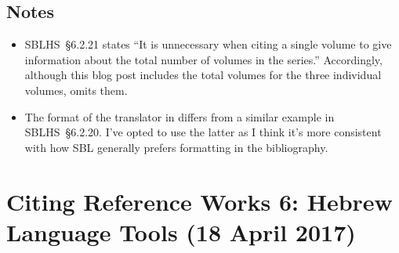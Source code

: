 \documentclass[a4paper]{article}
\begin{document}
\subsection{Notes}

\begin{itemize}
  \item SBLHS~§6.2.21 states “It is unnecessary when citing a single volume to
    give information about the total number of volumes in the series.”
    Accordingly, although this blog post includes the total volumes for the
    three individual  volumes,
     omits them.
  \item The format of the translator in  differs
    from a similar example in SBLHS~§6.2.20. I've opted to use the latter as I
    think it's more consistent with how SBL generally prefers formatting in
    the bibliography.
\end{itemize}


\section{Citing Reference Works 6: Hebrew Language Tools (18 April 2017)}
\end{document}
